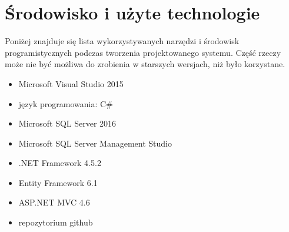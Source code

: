\section{Środowisko i użyte technologie}
Poniżej znajduje się lista wykorzystywanych narzędzi i środowisk programistycznych podczas tworzenia projektowanego systemu. Część rzeczy może nie być możliwa do zrobienia w starszych wersjach, niż było korzystane.

\begin{itemize}
    \item Microsoft Visual Studio 2015
    \item język programowania: C#
    \item Microsoft SQL Server 2016
    \item Microsoft SQL Server Management Studio
    \item .NET Framework 4.5.2
    \item Entity Framework 6.1
    \item ASP.NET MVC 4.6
    \item repozytorium github
\end{itemize}